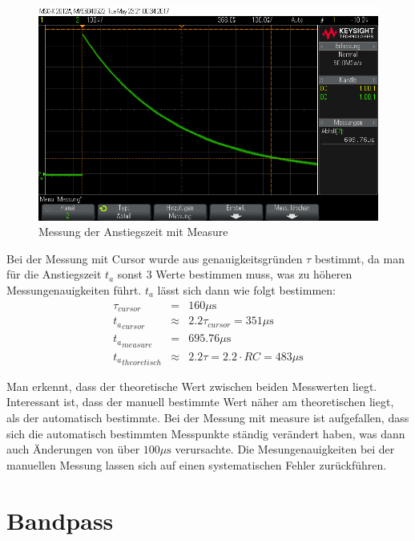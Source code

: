 \documentclass[10pt]{scrreprt}
\begin{document}
    \begin{center}
        \begin{figure}[H]
            \includegraphics[width=\textwidth]{scope_2.png}
            \caption{Messung der Anstiegszeit mit Measure}
        \end{figure}
    \end{center}


    Bei der Messung mit Cursor wurde aus genauigkeitsgründen $\tau$ bestimmt,
    da man für die Anstiegszeit $t_a$ sonst $3$ Werte bestimmen muss, was zu
    höheren Messungenauigkeiten führt. $t_a$ lässt sich dann wie folgt bestimmen:
    \begin{eqnarray*}
        \tau_{cursor} &=& 160 \si{\mu\second}\\
        {t_a}_{cursor} &\approx& 2.2 \tau_{cursor} = 351 \si{\mu\second}\\
        {t_a}_{measure} &=& 695.76 \si{\mu\second}\\
        {t_a}_{theoretisch} &\approx& 2.2\tau = 2.2 \cdot RC = 483 \si{\mu\second}
    \end{eqnarray*}

    Man erkennt, dass der theoretische Wert zwischen beiden Messwerten liegt.
    Interessant ist, dass der manuell bestimmte Wert näher am theoretischen liegt,
    als der automatisch bestimmte. Bei der Messung mit measure ist aufgefallen,
    dass sich die automatisch bestimmten Messpunkte ständig verändert haben, was
    dann auch Änderungen von über $100\si{\mu\second}$ verursachte. Die Mesungenauigkeiten
    bei der manuellen Messung lassen sich auf einen systematischen Fehler zurückführen.

    \section{Bandpass}
\end{document}
